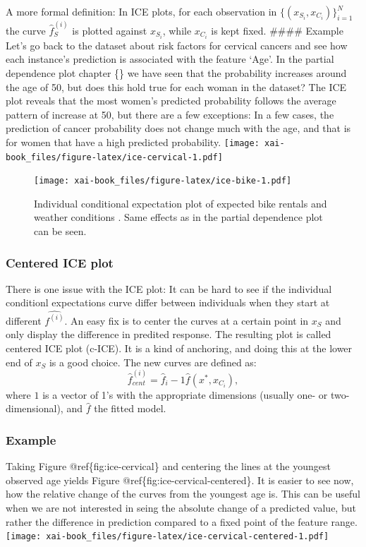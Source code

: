 \documentclass[12pt,]{krantz}
\theoremstyle{definition}
\theoremstyle{definition}
\theoremstyle{definition}
\theoremstyle{remark}
\begin{document}
A more formal definition: In ICE plots, for each observation in
\(\{(x_{S_i}, x_{C_i})\}_{i=1}^N\) the curve \(\hat{f}_S^{(i)}\) is
plotted against \(x_{S_i}\), while \(x_{C_i}\) is kept fixed. \#\#\#\#
Example Let's go back to the dataset about risk factors for cervical
cancers and see how each instance's prediction is associated with the
feature `Age'. In the partial dependence plot chapter \{\citet{pdp}\} we
have seen that the probability increases around the age of 50, but does
this hold true for each woman in the dataset? The ICE plot reveals that
the most women's predicted probability follows the average pattern of
increase at 50, but there are a few exceptions: In a few cases, the
prediction of cancer probability does not change much with the age, and
that is for women that have a high predicted probability.
\texttt{[image: xai-book\_files/figure-latex/ice-cervical-1.pdf]}

\begin{figure}
\centering
\texttt{[image: xai-book\_files/figure-latex/ice-bike-1.pdf]}
\caption{\label{fig:ice-bike}Individual conditional expectation plot of
expected bike rentals and weather conditions . Same effects as in the
partial dependence plot can be seen.}
\end{figure}

\subsubsection{Centered ICE plot}\label{centered-ice-plot}

There is one issue with the ICE plot: It can be hard to see if the
individual conditionl expectations curve differ between individuals when
they start at different \(\hat{f^{(i)}}\). An easy fix is to center the
curves at a certain point in \(x_S\) and only display the difference in
predited response. The resulting plot is called centered ICE plot
(c-ICE). It is a kind of anchoring, and doing this at the lower end of
\(x_S\) is a good choice. The new curves are defined as:
\[\hat{f}_{cent}^{(i)} = \hat{f}_i - 1\hat{f}(x^{\text{*}}, x_{C_i}), \]
where \(1\) is a vector of 1's with the appropriate dimensions (usually
one- or two-dimensional), and \(\hat{f}\) the fitted model.

\subsubsection{Example}\label{example-1}

Taking Figure @ref\{fig:ice-cervical\} and centering the lines at the
youngest observed age yields Figure @ref\{fig:ice-cervical-centered\}.
It is easier to see now, how the relative change of the curves from the
youngest age is. This can be useful when we are not interested in seing
the absolute change of a predicted value, but rather the difference in
prediction compared to a fixed point of the feature range.
\texttt{[image: xai-book\_files/figure-latex/ice-cervical-centered-1.pdf]}
\end{document}
